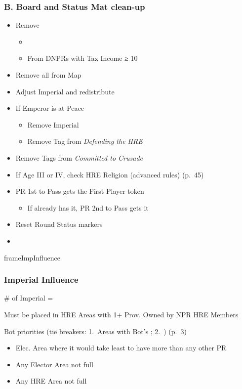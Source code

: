 \documentclass[10pt]{article}
\begin{document}
\subsubsection*{B. Board and Status Mat clean-up}
\begin{itemize}
	\item Remove \alliances
	\begin{itemize}
		\item {}
		\item From DNPRs with Tax Income ≥ 10\ducats
	\end{itemize}
	\item Remove all \plague from Map
	\item {}Adjust Imperial \influence and redistribute
	\item If Emperor is at Peace
	\begin{itemize}
		\item Remove Imperial \manpower
		\item Remove Tag from \emph{Defending the HRE}
	\end{itemize}
	\item Remove Tags from \emph{Committed to Crusade}
	\item {}If Age III or IV, check HRE Religion (advanced rules) (p.~45)
	\item PR 1st to Pass gets the First Player token
	\begin{itemize}
		\item If already has it, PR 2nd to Pass gets it
	\end{itemize}
	\item Reset Round Status markers
	\item {}
\end{itemize}
\begin{dynamiccontents*}{frameImpInfluence}
	\subsubsection*{Imperial Influence }
	\begin{itemize}
		\item \# of Imperial \influence = \authority
		\item Must be placed in HRE Areas with 1+ Prov. Owned by NPR HRE Members
		{\botrules
		\item Bot priorities (tie breakers: 1. Areas with Bot's \allies; 2. \az) (p.~3)
		\begin{itemize}
			\item Elec. Area where it would take least \influence to have more \influence than any other PR
			\item Any Elector Area not full
			\item Any HRE Area not full
		\end{itemize}
		}
	\end{itemize}
\end{dynamiccontents*}
\end{document}
